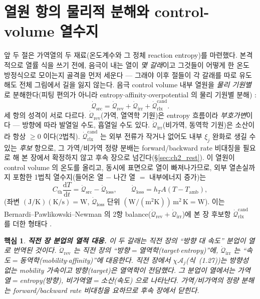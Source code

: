 \documentclass[11pt,a4paper]{article}
\newtheorem*{keybox}{핵심}
\newcommand{\dd}{\mathrm{d}}
\newcommand{\src}{\mathrm{src}}
\newcommand{\rev}{\mathrm{rev}}
\newcommand{\irr}{\mathrm{irr}}
\newcommand{\rlx}{\mathrm{rlx}}
\newcommand{\amb}{\mathrm{amb}}
\newcommand{\Th}{\mathrm{th}}
\newcommand{\loss}{\mathrm{loss}}
\newcommand{\cand}{\mathrm{cand}}
\begin{document}
\section{열원 항의 물리적 분해와 control-volume 열수지}\label{sec:ch2_decomp}
앞 두 절은 가역열의 두 재료(온도계수와 그 정체 reaction entropy)를 마련했다. 본격적으로 열률 식을 쓰기 전에, 음극이
내는 열이 \emph{몇 갈래}이고 그것들이 어떻게 한 온도 방정식으로 모이는지 골격을 먼저 세운다 — 그래야 이후 절들이
각 갈래를 따로 유도해도 전체 그림에서 길을 잃지 않는다. 음극 control volume 내부 열원을 \emph{물리 기원별}로
분해한다(피팅 편의가 아니라 entropy$\cdot$affinity$\cdot$overpotential 의 물리 기원별 분해)
\cite{bernardi1985,rao1997}:
\begin{equation}
\dot{\mathcal Q}_{\src}=\dot{\mathcal Q}_{\rev}+\dot{\mathcal Q}_{\irr}+\dot{\mathcal Q}_{\rlx}^{\cand}.
\label{eq:ch2_srcdecomp}
\end{equation}
세 항의 성격이 서로 다르다. $\dot{\mathcal Q}_{\rev}$(가역, 열역학 기원)은 entropy 흐름이라 \emph{부호가변}이다 —
방향에 따라 발열일 수도, 흡열일 수도 있다. $\dot{\mathcal Q}_{\irr}$(비가역, 동역학 기원)은 소산이라 항상 $\ge0$
이다(2법칙). $\dot{\mathcal Q}_{\rlx}^{\cand}$ 는 외부 전류가 작거나 없어도 내부 $\xi_j$ 완화로 생길 수 있는
\emph{후보} 항으로, 그 가역/비가역 정량 분배는 forward/backward rate 비대칭을 필요로 해 본 장에서 확정하지 않고
후속 장으로 넘긴다(\S\ref{sec:ch2_rest}). 이 열원이 control volume 의 온도를 올리고, 동시에 표면으로 열이
빠져나가므로, 외부 열손실까지 포함한 1법칙 열수지(들어온 열 $-$ 나간 열 $=$ 내부에너지 증가)는
\begin{equation}
C_\Th\frac{\dd T}{\dd t}=\dot{\mathcal Q}_{\src}-\dot{\mathcal Q}_{\loss},\qquad
\dot{\mathcal Q}_{\loss}=h_T A(T-T_\amb),
\label{eq:ch2_balance}
\end{equation}
(좌변 $\mathrm{(J/K)(K/s)=W}$, $\dot{\mathcal Q}_{\loss}$ 단위 $\mathrm{(W/(m^2K))\,m^2\,K=W}$). 이는
Bernardi--Pawlikowski--Newman 의 2항 balance($\dot{\mathcal Q}_\rev+\dot{\mathcal Q}_\irr$)에 본 장 후보항 $\dot{\mathcal Q}_{\rlx}^{\cand}$
를 더한 형태다 \cite{bernardi1985}.

\begin{keybox}
\textbf{직전 장 분업의 열적 대응.} 이 두 갈래는 직전 장의 ``방향 대 속도'' 분업이 열로 번역된 것이다.
$\dot{\mathcal Q}_{\rev}$ 는 직전 장의 ``방향$=$열역학(target$\cdot$entropy)''에, $\dot{\mathcal Q}_{\irr}$ 는
``속도$=$동역학(mobility$\cdot$affinity)''에 대응한다. 직전 장에서 $\chi\mathcal A_j$(식~(1.27))는 방향성 없는
mobility 가속이고 방향(target)은 열역학이 전담했다. 그 분업이 열에서는 \emph{가역열$=$entropy(방향)},
\emph{비가역열$=$소산(속도)} 으로 나타난다. 가역/비가역의 \emph{정량} 분해는 forward/backward rate 비대칭을
요하므로 후속 장에서 닫힌다.
\end{keybox}
\end{document}
